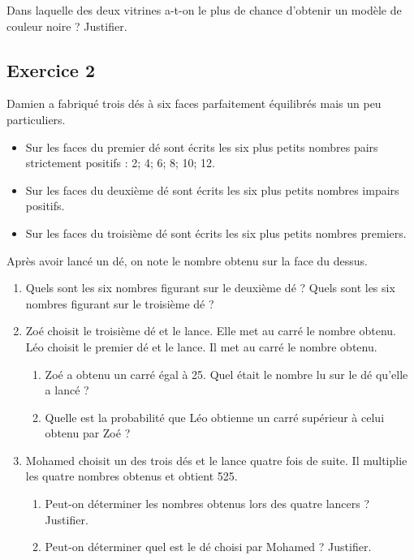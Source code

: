 \documentclass[10pt,a4paper,landscape]{article}
\begin{document}
\begin{multicols}{3}
\begin{enumerate}
Dans laquelle des deux vitrines a-t-on le plus de chance d’obtenir un modèle de couleur noire ? Justifier.
\end{enumerate}

\subsection*{Exercice 2}

Damien a fabriqué trois dés à six faces parfaitement équilibrés mais un peu particuliers.

\begin{itemize}
    \item Sur les faces du premier dé sont écrits les six plus petits nombres pairs strictement positifs : 2; 4; 6; 8; 10; 12.
    \item Sur les faces du deuxième dé sont écrits les six plus petits nombres impairs positifs. 
    \item Sur les faces du troisième dé sont écrits les six plus petits nombres premiers. 
\end{itemize}      
Après avoir lancé un dé, on note le nombre obtenu sur la face du dessus.

\begin{enumerate}
    \item Quels sont les six nombres figurant sur le deuxième dé ?
       Quels sont les six nombres figurant sur le troisième dé ?   
    \item Zoé choisit le troisième dé et le lance. Elle met au carré le nombre obtenu. Léo choisit le premier dé et le lance. Il met au carré le nombre obtenu.
    \begin{enumerate}
       \item Zoé a obtenu un carré égal à 25. Quel était le nombre lu sur le dé qu’elle a lancé ?
       \item Quelle est la probabilité que Léo obtienne un carré supérieur à celui obtenu par Zoé ?
    \end{enumerate}
    \item Mohamed choisit un des trois dés et le lance quatre fois de suite. Il multiplie les quatre nombres obtenus et obtient 525.
    \begin{enumerate}
       \item Peut-on déterminer les nombres obtenus lors des quatre lancers ? Justifier.
       \item Peut-on déterminer quel est le dé choisi par Mohamed ? Justifier. 
    \end{enumerate}
\end{enumerate}


\end{multicols}
\end{document}
